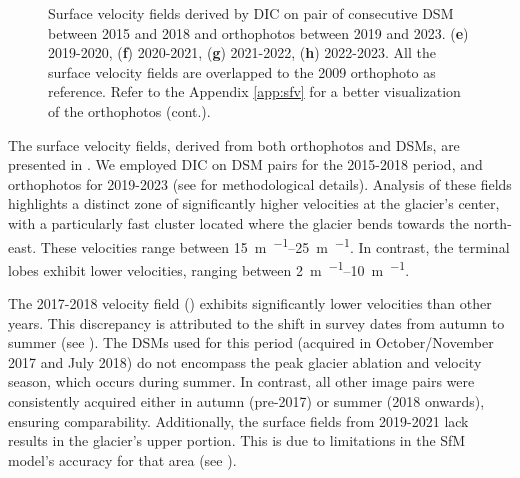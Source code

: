 \begin{figure}[!p]
{    } 
    \caption{Surface velocity fields derived by DIC on pair of consecutive DSM between 2015 and 2018 and 
    orthophotos between 2019 and 2023. (\textbf{e}) 2019-2020, (\textbf{f}) 2020-2021, (\textbf{g}) 2021-2022, (\textbf{h}) 2022-2023.
    All the surface velocity fields are overlapped to the 2009 orthophoto \citep{Degaetani2021} as reference. Refer to the Appendix \ref{app:sfv} for a better visualization of the orthophotos (cont.).}
\end{figure}

The surface velocity fields, derived from both orthophotos and DSMs, are presented in . 
We employed DIC on DSM pairs for the 2015-2018 period, and orthophotos for 2019-2023 (see  for methodological details). 
Analysis of these fields highlights a distinct zone of significantly higher velocities at the glacier's center,
with a particularly fast cluster located where the glacier bends towards the north-east. 
These velocities range between \SIrange{15}{25}{\meter\per\year}. 
In contrast, the terminal lobes exhibit lower velocities, ranging between \SIrange{2}{10}{\meter\per\year}.

The 2017-2018 velocity field () exhibits significantly lower velocities than other years. 
This discrepancy is attributed to the shift in survey dates from autumn to summer (see ). 
The DSMs used for this period (acquired in October/November 2017 and July 2018) do not encompass the peak glacier ablation 
and velocity season, which occurs during summer. 
In contrast, all other image pairs were consistently acquired either in autumn (pre-2017) or summer (2018 onwards), 
ensuring comparability.  
Additionally, the surface fields from 2019-2021 lack results in the glacier's upper portion. 
This is due to limitations in the SfM model's accuracy for that area (see ).

